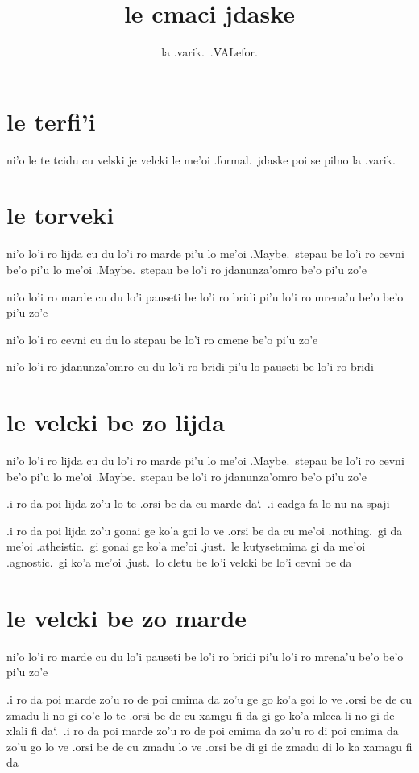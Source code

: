 \documentclass{report}
\title{le cmaci jdaske}
\author{la .varik.\ .VALefor.}
\newcommand\sds{\spacefactor\sfcode`.\ \space}
\newcommand\lijdyvelcki{lo'i ro lijda cu du lo'i ro marde pi'u lo me'oi .Maybe.\ stepau be lo'i ro cevni be'o pi'u lo me'oi .Maybe.\ stepau be lo'i ro jdanunza'omro be'o pi'u zo'e}
\newcommand\mardyvelcki{lo'i ro marde cu du lo'i pauseti be lo'i ro bridi pi'u lo'i ro mrena'u be'o be'o pi'u zo'e}
\newcommand\cevnyvelcki{lo'i ro cevni cu du lo stepau be lo'i ro cmene be'o pi'u zo'e}
\newcommand\jdanunzahomrovelcki{lo'i ro jdanunza'omro cu du lo'i ro bridi pi'u lo pauseti be lo'i ro bridi}
\begin{document}
\maketitle{}
\tableofcontents{}
\chapter{le terfi'i}
ni'o le te tcidu cu velski je velcki le me'oi .formal.\ jdaske poi se pilno la .varik.

\chapter{le torveki}
ni'o \lijdyvelcki

ni'o \mardyvelcki

ni'o \cevnyvelcki

ni'o \jdanunzahomrovelcki

\chapter{le velcki be zo lijda}
ni'o \lijdyvelcki

.i ro da poi lijda zo'u lo te .orsi be da cu marde da\sds  .i cadga fa lo nu na spaji

.i ro da poi lijda zo'u gonai ge ko'a goi lo ve .orsi be da cu me'oi .nothing.\ gi da me'oi .atheistic.\ gi gonai ge ko'a me'oi .just.\ le kutysetmima gi da me'oi .agnostic.\ gi ko'a me'oi .just.\ lo cletu be lo'i velcki be lo'i cevni be da

\chapter{le velcki be zo marde}
ni'o \mardyvelcki

.i ro da poi marde zo'u ro de poi cmima da zo'u ge go ko'a goi lo ve .orsi be de cu zmadu li no gi co'e lo te .orsi be de cu xamgu fi da gi go ko'a mleca li no gi de xlali fi da\sds .i ro da poi marde zo'u ro de poi cmima da zo'u ro di poi cmima da zo'u go lo ve .orsi be de cu zmadu lo ve .orsi be di gi de zmadu di lo ka xamagu fi da
\end{document}
